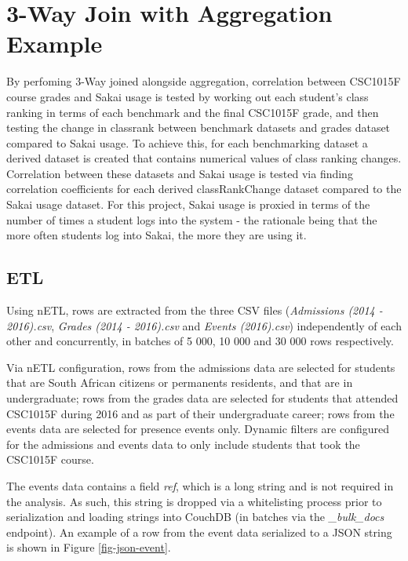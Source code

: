\section{3-Way Join with Aggregation Example}
By perfoming 3-Way joined alongside aggregation, correlation between CSC1015F course grades and Sakai usage is tested by working out each student's class ranking in terms of each benchmark and the final CSC1015F grade, and then testing the change in classrank between benchmark datasets and grades dataset compared to Sakai usage. To achieve this, for each benchmarking dataset a derived dataset is created that contains numerical values of class ranking changes. Correlation between these datasets and Sakai usage is tested via finding correlation coefficients for each derived classRankChange dataset compared to the Sakai usage dataset. For this project, Sakai usage is proxied in terms of the number of times a student logs into the system - the rationale being that the more often students log into Sakai, the more they are using it.

\subsection{ETL}
Using nETL, rows are extracted from the three CSV files (\textit{Admissions (2014 - 2016).csv}, \textit{Grades (2014 - 2016).csv} and \textit{Events (2016).csv}) independently of each other and concurrently, in batches of 5 000, 10 000 and 30 000 rows respectively.

Via nETL configuration, rows from the admissions data are selected for students that are South African citizens or permanents residents, and that are in undergraduate; rows from the grades data are selected for students that attended CSC1015F during 2016 and as part of their undergraduate career; rows from the events data are selected for presence events only. Dynamic filters are configured for the admissions and events data to only include students that took the CSC1015F course.

The events data contains a field \textit{ref}, which is a long string and is not required in the analysis. As such, this string is dropped via a whitelisting process prior to serialization and loading strings into CouchDB (in batches via the \textit{\_bulk\_docs} endpoint). An example of a row from the event data serialized to a JSON string is shown in Figure \ref{fig-json-event}.




